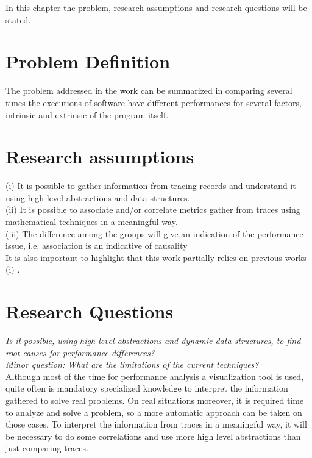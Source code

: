\label{sec:Theme1}
In this chapter the problem, research assumptions and research questions will be stated.
\section{Problem Definition}
The problem addressed in the work can be summarized in comparing several times the executions of software have different performances for several factors, intrinsic and extrinsic of the program itself.
\section{Research assumptions}
(i) It is possible to gather information from tracing records and understand it using high level abstractions and data structures.\\
(ii) It is possible to associate and/or correlate metrics gather from traces using mathematical techniques in a meaningful way.\\
(iii) The difference among the groups will give an indication of the performance issue, i.e. association is an indicative of causality\\
It is also important to highlight that this work partially relies on previous works (i) \cite{doray_thesis}.

\section{Research Questions}
\textit{Is it possible, using high level abstractions and dynamic data structures, to find root causes for performance differences?}\\
\textit{Minor question: What are the limitations of the current techniques?}\\
  
Although most of the time for performance analysis a visualization tool is used, quite often is mandatory specialized knowledge to interpret the information gathered to solve real problems. On real situations moreover, it is required time to analyze and solve a problem, so a more automatic approach can be taken on those cases. To interpret the information from traces in a meaningful way, it will be necessary to do some correlations and use more high level abstractions than just comparing traces.

